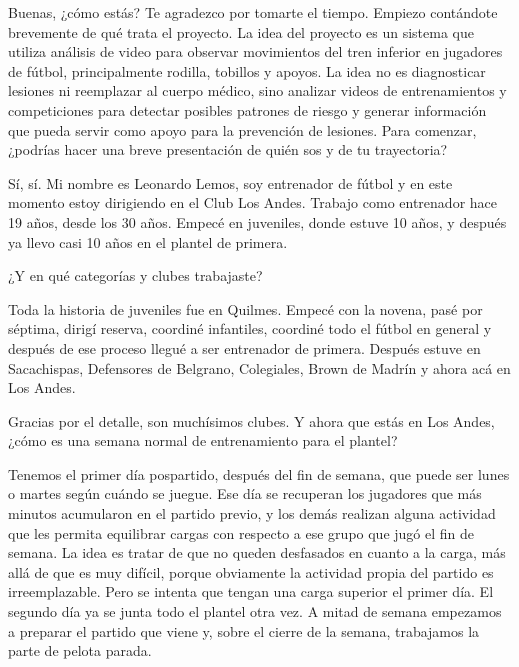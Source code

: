 \begin{description}[leftmargin=0pt, itemindent=\parindent, labelsep=0.5em, itemsep=0pt, parsep=0pt, topsep=0pt]
    \item[\textbf{Entrevistador:}] Buenas, ¿cómo estás? Te agradezco por tomarte el tiempo. Empiezo contándote brevemente de qué trata el proyecto. La idea del proyecto es un sistema que utiliza análisis de video para observar movimientos del tren inferior en jugadores de fútbol, principalmente rodilla, tobillos y apoyos. La idea no es diagnosticar lesiones ni reemplazar al cuerpo médico, sino analizar videos de entrenamientos y competiciones para detectar posibles patrones de riesgo y generar información que pueda servir como apoyo para la prevención de lesiones. Para comenzar, ¿podrías hacer una breve presentación de quién sos y de tu trayectoria?

    \item[\textbf{Leonardo Lemos:}] Sí, sí. Mi nombre es Leonardo Lemos, soy entrenador de fútbol y en este momento estoy dirigiendo en el Club Los Andes. Trabajo como entrenador hace 19 años, desde los 30 años. Empecé en juveniles, donde estuve 10 años, y después ya llevo casi 10 años en el plantel de primera.

    \item[\textbf{Entrevistador:}] ¿Y en qué categorías y clubes trabajaste?

    \item[\textbf{Leonardo Lemos:}] Toda la historia de juveniles fue en Quilmes. Empecé con la novena, pasé por séptima, dirigí reserva, coordiné infantiles, coordiné todo el fútbol en general y después de ese proceso llegué a ser entrenador de primera. Después estuve en Sacachispas, Defensores de Belgrano, Colegiales, Brown de Madrín y ahora acá en Los Andes.

    \item[\textbf{Entrevistador:}] Gracias por el detalle, son muchísimos clubes. Y ahora que estás en Los Andes, ¿cómo es una semana normal de entrenamiento para el plantel?

    \item[\textbf{Leonardo Lemos:}] Tenemos el primer día pospartido, después del fin de semana, que puede ser lunes o martes según cuándo se juegue. Ese día se recuperan los jugadores que más minutos acumularon en el partido previo, y los demás realizan alguna actividad que les permita equilibrar cargas con respecto a ese grupo que jugó el fin de semana. La idea es tratar de que no queden desfasados en cuanto a la carga, más allá de que es muy difícil, porque obviamente la actividad propia del partido es irreemplazable. Pero se intenta que tengan una carga superior el primer día. El segundo día ya se junta todo el plantel otra vez. A mitad de semana empezamos a preparar el partido que viene y, sobre el cierre de la semana, trabajamos la parte de pelota parada.


\end{description}
